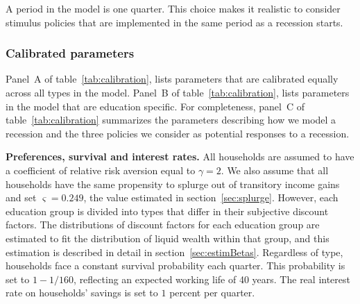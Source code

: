 \documentclass[\econtexRoot/HAFiscal]{subfiles}
\begin{document}
A period in the model is one quarter.
This choice makes it realistic to consider stimulus policies that are implemented in the same period as a recession starts.


\subsubsection{Calibrated parameters} 
\notinsubfile{\label{sec:calib}}

Panel~A of table~\ref{tab:calibration}, lists parameters that are calibrated equally across all types in the model.
Panel~B of table~\ref{tab:calibration}, lists parameters in the model that are education specific.
For completeness, panel~C of table~\ref{tab:calibration} summarizes the parameters describing how we model a recession and the three policies we consider as potential responses to a recession.


\textbf{Preferences, survival and interest rates.} All households are assumed to have a coefficient of relative risk aversion equal to $\gamma=2$.
We also assume that all households have the same propensity to splurge out of transitory income gains and set $\varsigma=0.249$, the value estimated in section~\ref{sec:splurge}.
However, each education group is divided into types that differ in their subjective discount factors.
The distributions of discount factors for each education group are estimated to fit the distribution of liquid wealth within that group, and this estimation is described in detail in section~\ref{sec:estimBetas}.
Regardless of type, households face a constant survival probability each quarter.
This probability is set to $1-1/160$, reflecting an expected working life of 40 years.
The real interest rate on households' savings is set to $1$ percent per quarter.
\end{document}
